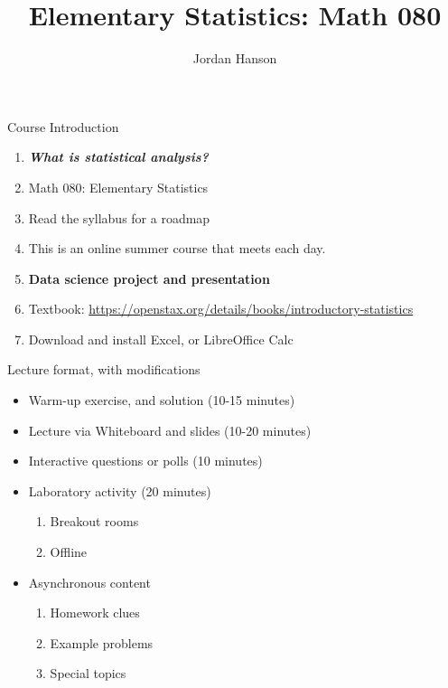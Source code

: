 \documentclass{beamer}
\title{Elementary Statistics: Math 080}
\author{Jordan Hanson}
\institute{Whittier College Department of Physics and Astronomy}
\begin{document}
\maketitle

\begin{frame}{Course Introduction}
\begin{enumerate}
\item \textit{\textbf{\alert{What is statistical analysis?}}}
\item Math 080: Elementary Statistics
\item Read the syllabus for a roadmap
\item This is an online summer course that meets each day.
\item \textbf{Data science project and presentation}
\item Textbook: \url{https://openstax.org/details/books/introductory-statistics}
\item Download and install Excel, or LibreOffice Calc
\end{enumerate}
\end{frame}

\begin{frame}{Lecture format, with modifications}
\begin{itemize}
\item Warm-up exercise, and solution (10-15 minutes)
\item Lecture via Whiteboard and slides (10-20 minutes)
\item Interactive questions or polls (10 minutes)
\item Laboratory activity (20 minutes)
\begin{enumerate}
\item Breakout rooms
\item Offline
\end{enumerate}
\item Asynchronous content
\begin{enumerate}
\item Homework clues
\item Example problems
\item Special topics
\end{enumerate}
\end{itemize}
\end{frame}
\end{document}
